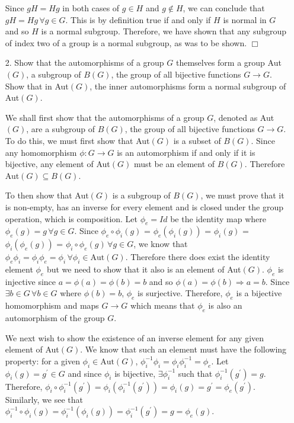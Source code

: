 \documentclass[12pt,letterpaper,reqno]{amsart}
\begin{document}
\begin{enumerate}
\begin{flushleft}
Since $gH = Hg$ in both cases of $g \in H$ and $g \not\in H$, we can conclude that $gH = Hg\, \forall g \in G$. This is by definition true if and only if $H$ is normal in $G$ and so $H$ is a normal subgroup. Therefore, we have shown that any subgroup of index two of a group is a normal subgroup, as was to be shown. $\Box$
\end{flushleft}

\newpage
\item[2.] Show that the automorphisms of a group $G$ themselves form a group Aut$(G)$, a subgroup of $B(G)$, the group of all bijective functions $G \rightarrow G$. Show that in Aut$(G)$, the inner automorphisms form a normal subgroup of Aut$(G)$.
\newline

\begin{flushleft}
We shall first show that the automorphisms of a group $G$, denoted as Aut$(G)$, are a subgroup of $B(G)$, the group of all bijective functions $G \rightarrow G$. To do this, we must first show that Aut$(G)$ is a subset of $B(G)$. Since any homomorphism $\phi: G \rightarrow G$ is an automorphism if and only if it is bijective, any element of Aut$(G)$ must be an element of $B(G)$. Therefore Aut$(G) \subseteq B(G)$. 
\newline

To then show that Aut$(G)$ is a subgroup of $B(G)$, we must prove that it is non-empty, has an inverse for every element and is closed under the group operation, which is composition. Let $\phi_e = Id$ be the identity map where $\phi_e(g) = g\, \forall g \in G$. Since $\phi_e \circ \phi_i (g)$ = $\phi_e(\phi_i(g))$ = $\phi_i(g)$ = $\phi_i(\phi_e(g))$ = $\phi_i \circ \phi_e(g)\, \forall g \in G$, we know that $\phi_e\phi_i = \phi_i\phi_e = \phi_i\, \forall \phi_i \in \text{Aut}(G)$. Therefore there does exist the identity element $\phi_e$ but we need to show that it also is an element of Aut$(G)$. $\phi_e$ is injective since $a = \phi(a) = \phi(b) = b$ and so $\phi(a) = \phi(b) \Rightarrow a = b$. Since $\exists b \in G\, \forall b \in G$ where $\phi(b) = b$, $\phi_e$ is surjective. Therefore, $\phi_e$ is a bijective homomorphism and maps $G \rightarrow G$ which means that $\phi_e$ is also an automorphism of the group $G$.
\newline

We next wish to show the existence of an inverse element for any given element of Aut$(G)$. We know that such an element must have the following property: for a given $\phi_i \in \text{Aut}(G)$, $\phi_i^{-1}\phi_i = \phi_i\phi_i^{-1} = \phi_e$. Let $\phi_i(g) = g^\prime \in G$ and since $\phi_i$ is bijective, $\exists \phi_i^{-1}$ such that $\phi_i^{-1}(g^\prime) = g$. Therefore, $\phi_i \circ \phi_i^{-1}(g^\prime) = \phi_i(\phi_i^{-1}(g^\prime)) = \phi_i(g) = g^\prime = \phi_e(g^\prime)$. Similarly, we see that $\phi_i^{-1} \circ \phi_i(g) = \phi_i^{-1}(\phi_i(g)) = \phi_i^{-1}(g^\prime) = g = \phi_e(g)$.
\newline


\end{flushleft}
\end{enumerate}
\end{document}
